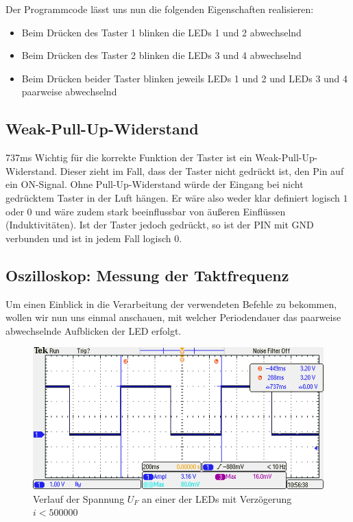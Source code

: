 \documentclass{article}
\begin{document}
Der Programmcode lässt uns nun die folgenden Eigenschaften realisieren:
\begin{itemize}
  \item Beim Drücken des Taster 1 blinken die LEDs 1 und 2 abwechselnd
  \item Beim Drücken des Taster 2 blinken die LEDs 3 und 4 abwechselnd
  \item Beim Drücken beider Taster blinken jeweils LEDs 1 und 2 und LEDs 3 und 4 paarweise abwechselnd
\end{itemize}

\subsection{Weak-Pull-Up-Widerstand}
737ms
Wichtig für die korrekte Funktion der Taster ist ein Weak-Pull-Up-Widerstand. Dieser zieht im Fall, dass der Taster nicht gedrückt ist, den Pin auf ein ON-Signal. Ohne Pull-Up-Widerstand würde der Eingang bei nicht gedrücktem
Taster in der Luft hängen. Er wäre also weder klar definiert logisch $1$ oder $0$ und wäre zudem stark beeinflussbar von äußeren Einflüssen (Induktivitäten).
Ist der Taster jedoch gedrückt, so ist der PIN mit GND verbunden und ist in jedem Fall logisch $0$.
\newpage
\subsection{Oszilloskop: Messung der Taktfrequenz}

Um einen Einblick in die Verarbeitung der verwendeten Befehle zu bekommen, wollen wir nun uns einmal anschauen, mit welcher Periodendauer das paarweise abwechselnde Aufblicken der LED erfolgt.

\begin{figure}[h]
  \includegraphics[width=\textwidth]{TEK00008.PNG}
  \caption{Verlauf der Spannung $U_F$ an einer der LEDs mit Verzögerung $i < 500000$} 
\end{figure}
\end{document}
